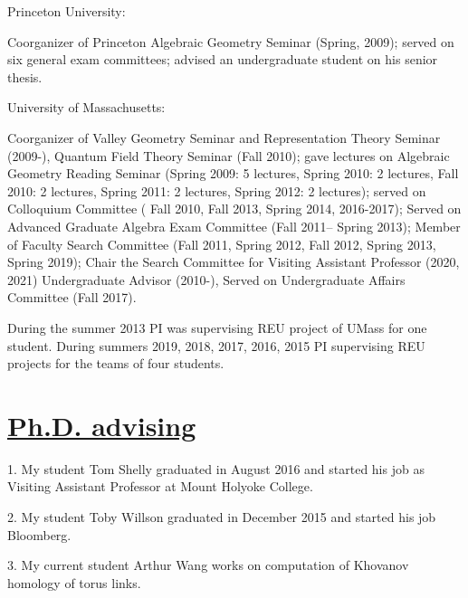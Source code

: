 \documentclass[11pt]{amsart}
\theoremstyle{plain}
\theoremstyle{definition}
\theoremstyle{remark}
\begin{document}
\noindent Princeton University:



\noindent Coorganizer of Princeton Algebraic Geometry Seminar (Spring, 2009); served on six general exam committees; advised an undergraduate student on his senior thesis.


\medskip

\noindent University of Massachusetts:

\noindent Coorganizer of Valley Geometry Seminar and Representation Theory Seminar (2009-), Quantum Field Theory Seminar (Fall 2010);
gave   lectures on Algebraic Geometry Reading Seminar (Spring 2009: 5 lectures, Spring 2010: 2 lectures, Fall 2010: 2 lectures, Spring 2011: 2 lectures, Spring 2012: 2 lectures); 
served on Colloquium Committee ( Fall 2010, Fall 2013, Spring 2014, 2016-2017); 
Served on Advanced Graduate Algebra Exam Committee (Fall 2011-- Spring 2013); Member of Faculty Search Committee 
(Fall 2011, Spring 2012, Fall 2012, Spring 2013, Spring 2019); Chair the Search Committee for Visiting Assistant Professor (2020, 2021)
Undergraduate Advisor (2010-), Served on Undergraduate Affairs Committee (Fall 2017).


\medskip

\noindent During the summer 2013 PI was supervising REU project of
UMass for one student. During summers 2019, 2018, 2017, 2016, 2015 PI supervising
REU projects for the teams of four students. 


\section*{\Large \underline{Ph.D. advising}}

\medskip

1. My student Tom Shelly graduated in August 2016 and started his job as Visiting Assistant Professor at Mount Holyoke College. 

2. My student Toby Willson graduated in December 2015 and started his job Bloomberg. 

3. My current student Arthur Wang works on computation of Khovanov homology of torus links.
\end{document}
